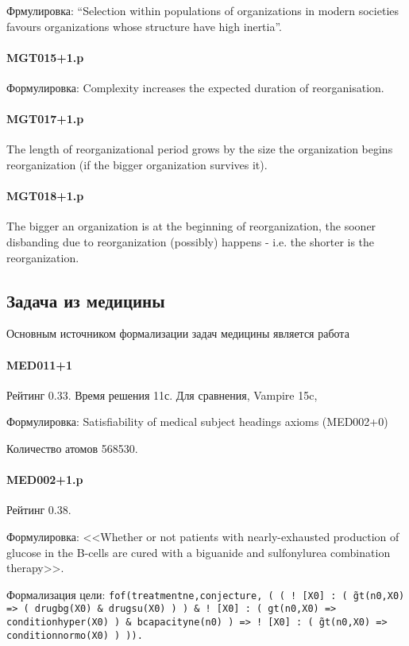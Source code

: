 Фрмулировка: ``Selection within populations of organizations in modern societies favours organizations whose structure have high inertia''.

\paragraph{MGT015+1.p}

Формулировка: Complexity increases the expected duration of reorganisation.

\paragraph{MGT017+1.p}
 The length of reorganizational period grows by the size the organization begins reorganization (if the bigger organization survives it).

\paragraph{MGT018+1.p}
The bigger an organization is at the beginning of reorganization, the sooner disbanding due to reorganization (possibly) happens - i.e. the shorter is the reorganization.


\subsection{Задача из медицины}
Основным источником формализации задач медицины является работа \cite{med1}

\paragraph{MED011+1}
Рейтинг 0.33. Время решения 11с. Для сравнения, Vampire 15c,

Формулировка: Satisfiability of medical subject headings axioms (MED002+0)

Количество атомов 568530.


\paragraph{MED002+1.p}
Рейтинг 0.38.

Формулировка: <<Whether or not patients with nearly-exhausted production of glucose in the B-cells are cured with a biguanide and sulfonylurea combination therapy>>.

Формализация цели:
\texttt{fof(treatmentne,conjecture,
    ( ( ! [X0] :
          ( \~ gt(n0,X0)
         => ( drugbg(X0)
            \& drugsu(X0) ) )
      \& ! [X0] :
          ( gt(n0,X0)
         => conditionhyper(X0) )
      \& bcapacityne(n0) )
   => ! [X0] :
        ( \~ gt(n0,X0)
       => conditionnormo(X0) ) )).}

